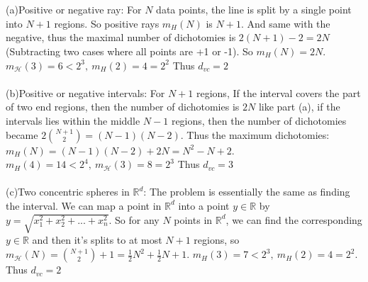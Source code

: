 \documentclass[12pt]{article}
\begin{document}
 \\\\
\indent (a)Positive or negative ray: For $N$ data points, the line is split by a single point into $N+1$ regions. So positive rays $m_H(N)$ is $N+1$. And same with the negative, thus the maximal number of dichotomies is $2(N+1)-2 = 2N$ (Subtracting two cases where all points are +1 or -1). So $m_H(N)=2N$. $\displaystyle m_\mathcal{H}(3) = 6 < 2^3,\ m_H(2) = 4 = 2^2$ Thus $d_{vc}=2$\\\\
\indent (b)Positive or negative intervals: For $N+1$ regions, If the interval covers the part of two end regions, then the number of dichotomies is $2N$ like part (a), if the intervals lies within the middle $N-1$ regions, then the number of dichotomies became $\displaystyle 2{N+1\choose2} = (N-1)(N-2)$. Thus the maximum dichotomies: $\displaystyle m_H(N) = (N-1)(N-2)+2N = N^2-N+2$. $\displaystyle m_H(4) = 14 < 2^4,\ m_\mathcal{H}(3) = 8 = 2^3$ Thus $d_{vc}=3$\\\\
\indent (c)Two concentric spheres in $\mathbb{R}^d$: The problem is essentially the same as finding the interval. We can map a point in $\mathbb{R}^d$ into a point $y\in \mathbb{R}$ by $y = \sqrt{x_1^2+x_2^2+...+x_n^2}$. So for any $N$ points in $\mathbb{R}^d$, we can find the corresponding $y\in \mathbb{R}$ and then it's splits to at most $N+1$ regions, so $\displaystyle m_\mathcal{H}(N)={N+1\choose 2}+1 = \frac{1}{2}N^2+\frac{1}{2}N+1$. $\displaystyle m_H(3) = 7 < 2^3,\ m_H(2) = 4 = 2^2$. Thus $d_{vc}=2$\\\\
\end{document}
